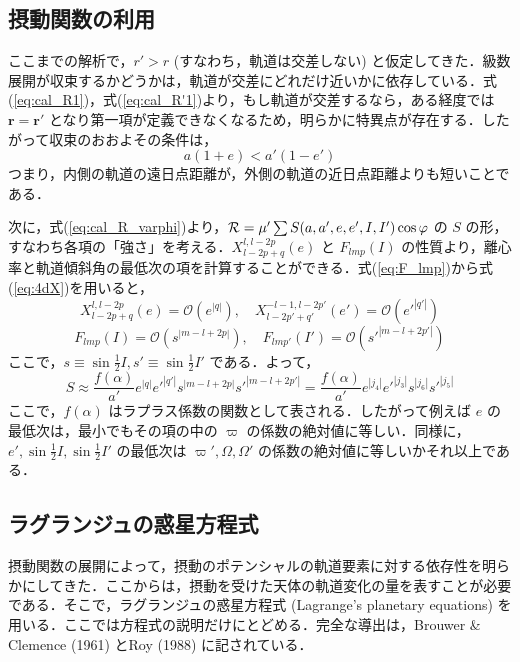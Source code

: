 \documentclass[11pt,a4paper,oneside,onecolumn]{jreport}
\begin{document}
\subsection{摂動関数の利用}
ここまでの解析で，$r' > r$ (すなわち，軌道は交差しない) と仮定してきた．級数展開が収束するかどうかは，軌道が交差にどれだけ近いかに依存している．式(\ref{eq:cal_R1})，式(\ref{eq:cal_R'1})より，もし軌道が交差するなら，ある経度では ${\bm r} = {\bm r'}$ となり第一項が定義できなくなるため，明らかに特異点が存在する．したがって収束のおおよその条件は，
\begin{equation}
a (1 + e) < a' (1 - e')
\end{equation}
つまり，内側の軌道の遠日点距離が，外側の軌道の近日点距離よりも短いことである．

次に，式(\ref{eq:cal_R_varphi})より，${\cal R} = \mu' \sum S (a,a',e,e',I,I') \cos \varphi$ の $S$ の形，すなわち各項の「強さ」を考える．$X_{l - 2p + q}^{l, l - 2p} (e)$ と $F_{lmp} (I)$ の性質より，離心率と軌道傾斜角の最低次の項を計算することができる．式(\ref{eq:F_lmp})から式(\ref{eq:4dX})を用いると，
\begin{equation}
X_{l - 2p + q}^{l, l - 2p} (e) = \mathcal{O} (e^{|q|}), \quad X_{l - 2p' + q'}^{-l -1, l - 2p'} (e') = \mathcal{O} (e'^{|q'|})
\end{equation}
\begin{equation}
F_{lmp} (I) = \mathcal{O} (s^{|m - l + 2p|}), \quad F_{lmp'} (I') = \mathcal{O} (s'^{|m - l + 2p'|})
\end{equation}
ここで，$s \equiv \sin \frac{1}{2} I, s' \equiv \sin \frac{1}{2} I'$ である．よって，
\begin{equation}
S \approx \frac{f (\alpha)}{a'} e^{|q|} e'^{|q'|} s^{|m - l + 2p|} s'^{|m - l + 2p'|} = \frac{f (\alpha)}{a'} e^{|j_4|} e'^{|j_3|} s^{|j_6|} s'^{|j_5|} \label{eq:S}
\end{equation}
ここで，$f (\alpha)$ はラプラス係数の関数として表される．したがって例えば $e$ の最低次は，最小でもその項の中の $\varpi$ の係数の絶対値に等しい．同様に，$e', \sin \frac{1}{2} I, \sin \frac{1}{2} I'$ の最低次は $\varpi', \Omega, \Omega'$ の係数の絶対値に等しいかそれ以上である．

\subsection{ラグランジュの惑星方程式}
摂動関数の展開によって，摂動のポテンシャルの軌道要素に対する依存性を明らかにしてきた．ここからは，摂動を受けた天体の軌道変化の量を表すことが必要である．そこで，ラグランジュの惑星方程式 (Lagrange's planetary equations) を用いる．ここでは方程式の説明だけにとどめる．完全な導出は，Brouwer \& Clemence (1961) とRoy (1988) に記されている．
\end{document}
